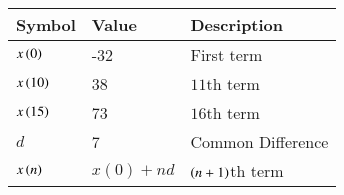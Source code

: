 \begin{tabular}{|m{5em} |m{5em}| m{10em} | }
    \hline
    \textbf{Symbol} &\textbf{Value} &\textbf{Description} \\
    \hline
         $x\left(0\right)$ & -32 & First term  \\
    \hline
        $x\left(10\right)$ & 38  & $11$th term \\
    \hline
        $x\left(15\right)$ & 73 & $16$th term\\
    \hline
        $d$ & 7 & Common Difference\\
    \hline
        $x\left(n\right)$ & $x(0)+nd$ & $\left(n+1\right)$th term\\
    \hline
    \end{tabular} 
